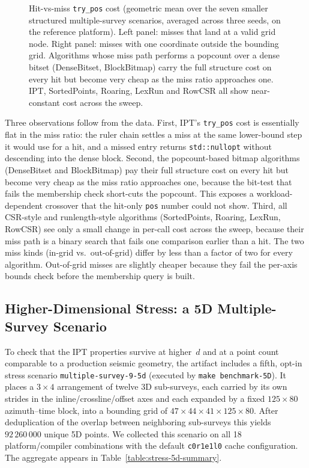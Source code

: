 \documentclass[manuscript,screen,review]{acmart}
\theoremstyle{definition}
\theoremstyle{plain}
\begin{document}
\begin{figure}[ht]
\centering

\caption{Hit-vs-miss \texttt{try\_pos} cost (geometric mean over the
  seven smaller structured multiple-survey scenarios, averaged across
  three seeds, on the
  reference platform). Left panel: misses that land at a valid grid
  node. Right panel: misses with one coordinate outside the bounding
  grid. Algorithms whose miss path performs a popcount over a dense
  bitset (DenseBitset, BlockBitmap) carry the full structure cost on
  every hit but become very cheap as the miss ratio approaches one.
  IPT, SortedPoints, Roaring, LexRun and RowCSR all show
  near-constant cost across the sweep.}
\label{figure:pos-mix-summary}
\end{figure}

Three observations follow from the data. First, IPT's
\texttt{try\_pos} cost is essentially flat in the miss ratio: the
ruler chain settles a miss at the same lower-bound step it would use
for a hit, and a missed entry returns \texttt{std::nullopt} without
descending into the dense block. Second, the popcount-based bitmap
algorithms (DenseBitset and BlockBitmap) pay their full structure
cost on every hit but become very cheap as the miss ratio approaches
one, because the bit-test that fails the membership check short-cuts
the popcount. This exposes a workload-dependent crossover that the
hit-only \texttt{pos} number could not show. Third, all CSR-style and
runlength-style algorithms (SortedPoints, Roaring, LexRun, RowCSR)
see only a small change in per-call cost across the sweep, because
their miss path is a binary search that fails one comparison earlier
than a hit. The two miss kinds (in-grid vs.\ out-of-grid) differ by
less than a factor of two for every algorithm. Out-of-grid misses are
slightly cheaper because they fail the per-axis bounds check before
the membership query is built.

\subsection{Higher-Dimensional Stress: a 5D Multiple-Survey Scenario}
\label{section:results-stress-5d}

To check that the IPT properties survive at higher~$d$ and at a point
count comparable to a production seismic geometry, the artifact
includes a fifth, opt-in stress scenario \texttt{multiple-survey-9-5d}
(executed by \texttt{make benchmark-5D}). It places a $3\times 4$
arrangement of twelve 3D sub-surveys, each carried by its own strides
in the inline/crossline/offset axes and each expanded by a fixed
$125\times 80$ azimuth--time block, into a bounding grid of
$47\times 44\times 41\times 125\times 80$. After deduplication of the
overlap between neighboring sub-surveys this yields $92\,260\,000$
unique 5D points. We collected this scenario on all 18
platform/compiler combinations with the default \texttt{c0r1e1l0}
cache configuration. The aggregate appears
in Table~\ref{table:stress-5d-summary}.
\end{document}

